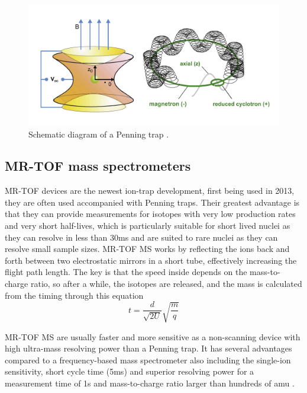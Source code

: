 \begin{figure}[H]
    \centering
    \includegraphics[width=.5\textwidth]{images/MS_penningtrap.png}
    \caption{Schematic diagram of a Penning trap \cite{famiano_nuclear_2019}.}\label{fig:MS_PT}
\end{figure}

\subsection{MR-TOF mass spectrometers}
MR-TOF devices are the newest ion-trap development, first being used in 2013, they are often used accompanied with Penning traps.
Their greatest advantage is that they can provide measurements for isotopes with very low production rates and very short half-lives, which is particularly suitable for short lived nuclei as they can resolve in less than 30ms and are suited to rare nuclei as they can resolve small sample sizes.
MR-TOF MS works by reflecting the ions back and forth between two electrostatic mirrors in a short tube, effectively increasing the flight path length.
The key is that the speed inside depends on the mass-to-charge ratio, so after a while, the isotopes are released, and the mass is calculated from the timing through this equation
\begin{equation}
    t = \frac{d}{\sqrt{2U}}\sqrt{\frac{m}{q}}
\end{equation}

MR-TOF MS are usually faster and more sensitive as a non-scanning device with high ultra-mass resolving power than a Penning trap.
It has several advantages compared to a frequency-based mass spectrometer also including the single-ion sensitivity, short cycle time (5ms) and superior resolving power for a measurement time of 1s and mass-to-charge ratio larger than hundreds of amu \cite{dickel_multiple-reflection_2013}.
